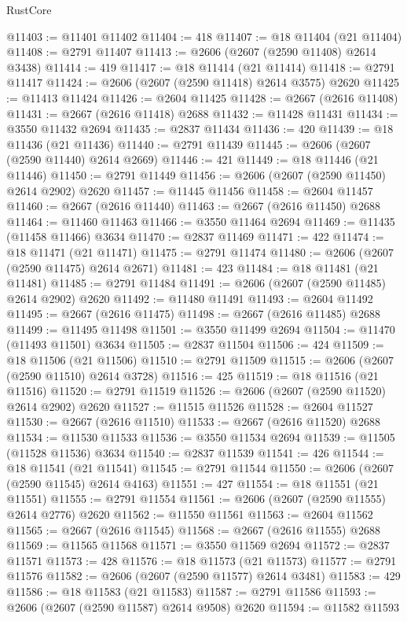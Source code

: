 \begin{lexlean}{RustCore}
\begin{coremodule}
@11403 := @11401 @11402
@11404 := 418
@11407 := @18 @11404 (@21 @11404)
@11408 := @2791 @11407
@11413 := @2606 (@2607 (@2590 @11408) @2614 @3438)
@11414 := 419
@11417 := @18 @11414 (@21 @11414)
@11418 := @2791 @11417
@11424 := @2606 (@2607 (@2590 @11418) @2614 @3575) @2620
@11425 := @11413 @11424
@11426 := @2604 @11425
@11428 := @2667 (@2616 @11408)
@11431 := @2667 (@2616 @11418) @2688
@11432 := @11428 @11431
@11434 := @3550 @11432 @2694
@11435 := @2837 @11434
@11436 := 420
@11439 := @18 @11436 (@21 @11436)
@11440 := @2791 @11439
@11445 := @2606 (@2607 (@2590 @11440) @2614 @2669)
@11446 := 421
@11449 := @18 @11446 (@21 @11446)
@11450 := @2791 @11449
@11456 := @2606 (@2607 (@2590 @11450) @2614 @2902) @2620
@11457 := @11445 @11456
@11458 := @2604 @11457
@11460 := @2667 (@2616 @11440)
@11463 := @2667 (@2616 @11450) @2688
@11464 := @11460 @11463
@11466 := @3550 @11464 @2694
@11469 := @11435 (@11458 @11466) @3634
@11470 := @2837 @11469
@11471 := 422
@11474 := @18 @11471 (@21 @11471)
@11475 := @2791 @11474
@11480 := @2606 (@2607 (@2590 @11475) @2614 @2671)
@11481 := 423
@11484 := @18 @11481 (@21 @11481)
@11485 := @2791 @11484
@11491 := @2606 (@2607 (@2590 @11485) @2614 @2902) @2620
@11492 := @11480 @11491
@11493 := @2604 @11492
@11495 := @2667 (@2616 @11475)
@11498 := @2667 (@2616 @11485) @2688
@11499 := @11495 @11498
@11501 := @3550 @11499 @2694
@11504 := @11470 (@11493 @11501) @3634
@11505 := @2837 @11504
@11506 := 424
@11509 := @18 @11506 (@21 @11506)
@11510 := @2791 @11509
@11515 := @2606 (@2607 (@2590 @11510) @2614 @3728)
@11516 := 425
@11519 := @18 @11516 (@21 @11516)
@11520 := @2791 @11519
@11526 := @2606 (@2607 (@2590 @11520) @2614 @2902) @2620
@11527 := @11515 @11526
@11528 := @2604 @11527
@11530 := @2667 (@2616 @11510)
@11533 := @2667 (@2616 @11520) @2688
@11534 := @11530 @11533
@11536 := @3550 @11534 @2694
@11539 := @11505 (@11528 @11536) @3634
@11540 := @2837 @11539
@11541 := 426
@11544 := @18 @11541 (@21 @11541)
@11545 := @2791 @11544
@11550 := @2606 (@2607 (@2590 @11545) @2614 @4163)
@11551 := 427
@11554 := @18 @11551 (@21 @11551)
@11555 := @2791 @11554
@11561 := @2606 (@2607 (@2590 @11555) @2614 @2776) @2620
@11562 := @11550 @11561
@11563 := @2604 @11562
@11565 := @2667 (@2616 @11545)
@11568 := @2667 (@2616 @11555) @2688
@11569 := @11565 @11568
@11571 := @3550 @11569 @2694
@11572 := @2837 @11571
@11573 := 428
@11576 := @18 @11573 (@21 @11573)
@11577 := @2791 @11576
@11582 := @2606 (@2607 (@2590 @11577) @2614 @3481)
@11583 := 429
@11586 := @18 @11583 (@21 @11583)
@11587 := @2791 @11586
@11593 := @2606 (@2607 (@2590 @11587) @2614 @9508) @2620
@11594 := @11582 @11593

\end{coremodule}
\end{lexlean}
